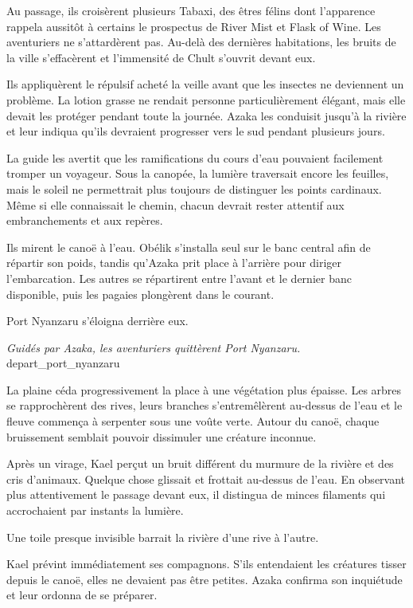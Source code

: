 Au passage, ils croisèrent plusieurs Tabaxi, des êtres félins dont l'apparence rappela aussitôt à certains le prospectus de River Mist et Flask of Wine. Les aventuriers ne s'attardèrent pas. Au-delà des dernières habitations, les bruits de la ville s'effacèrent et l'immensité de Chult s'ouvrit devant eux.

Ils appliquèrent le répulsif acheté la veille avant que les insectes ne deviennent un problème. La lotion grasse ne rendait personne particulièrement élégant, mais elle devait les protéger pendant toute la journée. Azaka les conduisit jusqu'à la rivière et leur indiqua qu'ils devraient progresser vers le sud pendant plusieurs jours.

La guide les avertit que les ramifications du cours d'eau pouvaient facilement tromper un voyageur. Sous la canopée, la lumière traversait encore les feuilles, mais le soleil ne permettrait plus toujours de distinguer les points cardinaux. Même si elle connaissait le chemin, chacun devrait rester attentif aux embranchements et aux repères.

Ils mirent le canoë à l'eau. Obélik s'installa seul sur le banc central afin de répartir son poids, tandis qu'Azaka prit place à l'arrière pour diriger l'embarcation. Les autres se répartirent entre l'avant et le dernier banc disponible, puis les pagaies plongèrent dans le courant.

Port Nyanzaru s'éloigna derrière eux.

{\textit{Guidés par Azaka, les aventuriers quittèrent Port Nyanzaru.}}
{depart_port_nyanzaru}

\scenebreak

La plaine céda progressivement la place à une végétation plus épaisse. Les arbres se rapprochèrent des rives, leurs branches s'entremêlèrent au-dessus de l'eau et le fleuve commença à serpenter sous une voûte verte. Autour du canoë, chaque bruissement semblait pouvoir dissimuler une créature inconnue.

Après un virage, Kael perçut un bruit différent du murmure de la rivière et des cris d'animaux. Quelque chose glissait et frottait au-dessus de l'eau. En observant plus attentivement le passage devant eux, il distingua de minces filaments qui accrochaient par instants la lumière.

Une toile presque invisible barrait la rivière d'une rive à l'autre.

Kael prévint immédiatement ses compagnons. S'ils entendaient les créatures tisser depuis le canoë, elles ne devaient pas être petites. Azaka confirma son inquiétude et leur ordonna de se préparer.

